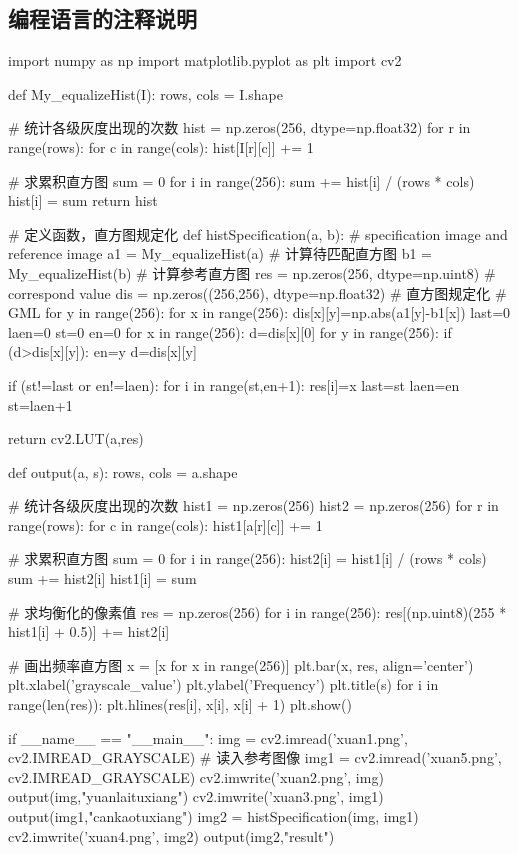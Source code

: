 \documentclass{article}
\begin{document}
\subsection{编程语言的注释说明}
\begin{python}
import numpy as np
import matplotlib.pyplot as plt
import cv2

def My_equalizeHist(I):
    rows, cols = I.shape

    # 统计各级灰度出现的次数
    hist = np.zeros(256, dtype=np.float32)
    for r in range(rows):
        for c in range(cols):
            hist[I[r][c]] += 1

    # 求累积直方图
    sum = 0
    for i in range(256):
        sum += hist[i] / (rows * cols)
        hist[i] = sum
    return hist

# 定义函数，直方图规定化
def histSpecification(a, b):  # specification image and reference image
    a1 = My_equalizeHist(a)  # 计算待匹配直方图
    b1 = My_equalizeHist(b)  # 计算参考直方图
    res = np.zeros(256, dtype=np.uint8)  # correspond value
    dis = np.zeros((256,256), dtype=np.float32)
    # 直方图规定化
    # GML
    for y in range(256):
        for x in range(256):
            dis[x][y]=np.abs(a1[y]-b1[x])
    last=0
    laen=0
    st=0
    en=0
    for x in range(256):
        d=dis[x][0]
        for y in range(256):
            if (d>dis[x][y]):
                en=y
                d=dis[x][y]

        if (st!=last or en!=laen):
            for i in range(st,en+1):
                res[i]=x
            last=st
            laen=en
            st=laen+1

    return cv2.LUT(a,res)

def output(a, s):
    rows, cols = a.shape

    # 统计各级灰度出现的次数
    hist1 = np.zeros(256)
    hist2 = np.zeros(256)
    for r in range(rows):
        for c in range(cols):
            hist1[a[r][c]] += 1

    # 求累积直方图
    sum = 0
    for i in range(256):
        hist2[i] = hist1[i] / (rows * cols)
        sum += hist2[i]
        hist1[i] = sum

    # 求均衡化的像素值
    res = np.zeros(256)
    for i in range(256):
        res[(np.uint8)(255 * hist1[i] + 0.5)] += hist2[i]

    # 画出频率直方图
    x = [x for x in range(256)]
    plt.bar(x, res, align='center')
    plt.xlabel('grayscale_value')
    plt.ylabel('Frequency')
    plt.title(s)
    for i in range(len(res)):
        plt.hlines(res[i], x[i], x[i] + 1)
    plt.show()

if __name__ == "__main__":
    img = cv2.imread('xuan1.png', cv2.IMREAD_GRAYSCALE)
    # 读入参考图像
    img1 = cv2.imread('xuan5.png', cv2.IMREAD_GRAYSCALE)
    cv2.imwrite('xuan2.png', img)
    output(img,"yuanlaituxiang")
    cv2.imwrite('xuan3.png', img1)
    output(img1,"cankaotuxiang")
    img2 = histSpecification(img, img1)
    cv2.imwrite('xuan4.png', img2)
    output(img2,"result")

\end{python}
\end{document}
